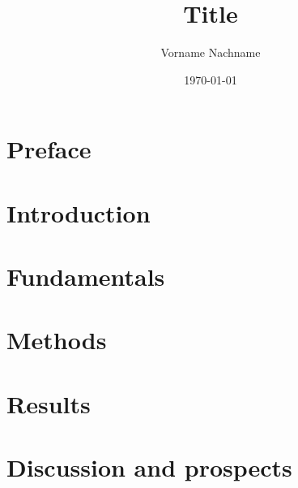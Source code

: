 \documentclass[a4paper, 11pt,abstract=on]{scrreprt}
\title{Title}
\author{Vorname Nachname}
\date{\today}
\begin{document}


\clearpage
\setcounter{page}{1}



\begin{abstract}

\end{abstract}

\chapter*{Preface}

\thispagestyle{empty}

\tableofcontents
\thispagestyle{empty}


\chapter{Introduction}
\setcounter{page}{1}


\chapter{Fundamentals}


\chapter{Methods}


\chapter{Results}


\chapter{Discussion and prospects}


\newpage

\listoffigures

\printbibliography[title=Bibliography]
\end{document}
